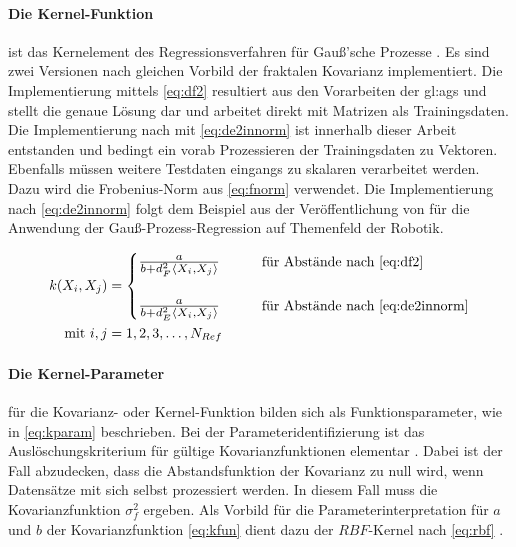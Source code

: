 \paragraph*{Die Kernel-Funktion} ist das Kernelement des Regressionsverfahren für Gauß'sche Prozesse \cite{Rasmussen2006}. Es sind zwei Versionen nach gleichen Vorbild der fraktalen Kovarianz \cite{Schuethe2020b}\cite{Schuethe2020}  implementiert. Die Implementierung mittels \autoref{eq:df2} resultiert aus den Vorarbeiten der \gls{gl:ags} und stellt die genaue Lösung dar und arbeitet direkt mit Matrizen als Trainingsdaten. Die Implementierung nach mit \autoref{eq:de2innorm} ist innerhalb dieser Arbeit entstanden und bedingt ein vorab Prozessieren der Trainingsdaten zu Vektoren. Ebenfalls müssen weitere Testdaten eingangs zu skalaren verarbeitet werden. Dazu wird die Frobenius-Norm aus \autoref{eq:fnorm} verwendet. Die Implementierung nach \autoref{eq:de2innorm} folgt dem Beispiel aus der Veröffentlichung von \citeauthor{Lang2014}\cite{Lang2014} für die Anwendung der Gauß-Prozess-Regression auf Themenfeld der Robotik.


\begin{align}\label{eq:kfun}
	k(X_i, X_j) &= 
		\begin{cases}
			\resizebox{.17\linewidth}{!}{$\frac{a}{b + d_F^2\langle X_i, X_j \rangle}$} &\qquad \text{für Abstände nach \autoref{eq:df2}} \\\\
			\resizebox{.17\linewidth}{!}{$\frac{a}{b + d_E^2\langle X_i, X_j \rangle}$} &\qquad \text{für Abstände nach \autoref{eq:de2innorm}}
		\end{cases} \\
\text{mit } i,j &= 1,2,3,\ldots,N_{Ref} \nonumber
\end{align}


\clearpage


\paragraph*{Die Kernel-Parameter} für die Kovarianz- oder Kernel-Funktion bilden sich als Funktionsparameter, wie in \autoref{eq:kparam} beschrieben. Bei der Parameteridentifizierung ist das Auslöschungskriterium für gültige Kovarianzfunktionen elementar \cite{Rasmussen2006}. Dabei ist der Fall abzudecken, dass die Abstandsfunktion der Kovarianz zu null wird, wenn Datensätze mit sich selbst prozessiert werden. In diesem Fall muss die Kovarianzfunktion $\sigma_f^2$ ergeben. Als Vorbild für die Parameterinterpretation für $a$ und $b$ der Kovarianzfunktion \autoref{eq:kfun} dient dazu der $RBF$-Kernel nach \autoref{eq:rbf} \cite{Rasmussen2006}.

